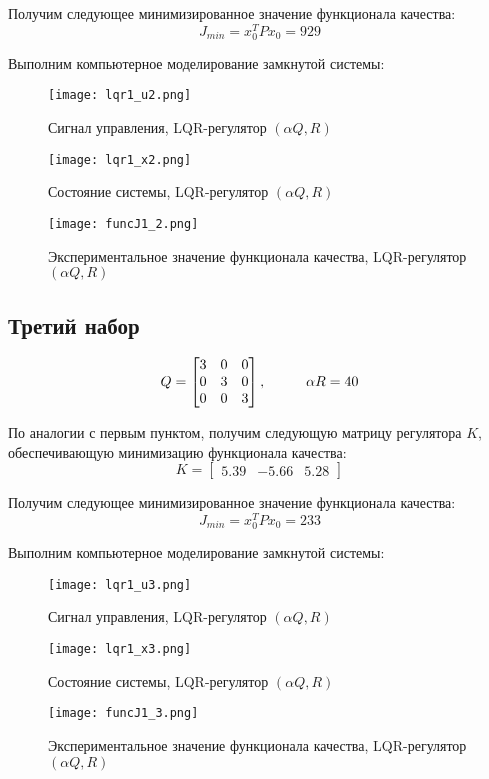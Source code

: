 Получим следующее минимизированное значение функционала качества:
$$
   J_{min} = x_0^T P x_0 = 929
$$

Выполним компьютерное моделирование замкнутой системы:

\begin{figure}[ht]
  \centering
  \texttt{[image: lqr1\_u2.png]}
  \caption{Сигнал управления, LQR-регулятор $( \alpha Q, R)$}
\end{figure}
\newpage
\begin{figure}[ht]
  \centering
  \texttt{[image: lqr1\_x2.png]}
  \caption{Состояние системы, LQR-регулятор $(\alpha Q, R)$}
\end{figure}
\begin{figure}[ht]
  \centering
  \texttt{[image: funcJ1\_2.png]}
  \caption{Экспериментальное значение функционала качества, LQR-регулятор $(\alpha Q, R)$}
\end{figure}

\newpage
\subsection{Третий набор}
$$
  Q = \begin{bmatrix}
                        3 & 0 & 0 \\
                        0 & 3 & 0 \\
                        0 & 0 & 3 
                      \end{bmatrix}, \hspace*{1cm} \alpha R=40
$$

По аналогии с первым пунктом, получим следующую матрицу регулятора $K$, обеспечивающую минимизацию функционала качества:
$$
   K = \begin{bmatrix} 5.39 & -5.66 &  5.28 \end{bmatrix}
$$

Получим следующее минимизированное значение функционала качества:
$$
   J_{min} = x_0^T P x_0 = 233
$$

Выполним компьютерное моделирование замкнутой системы:

\begin{figure}[ht]
  \centering
  \texttt{[image: lqr1\_u3.png]}
  \caption{Сигнал управления, LQR-регулятор $( \alpha Q, R)$}
\end{figure}
\newpage
\begin{figure}[ht]
  \centering
  \texttt{[image: lqr1\_x3.png]}
  \caption{Состояние системы, LQR-регулятор $(\alpha Q, R)$}
\end{figure}
\begin{figure}[ht]
  \centering
  \texttt{[image: funcJ1\_3.png]}
  \caption{Экспериментальное значение функционала качества, LQR-регулятор $(\alpha Q, R)$}
\end{figure}

